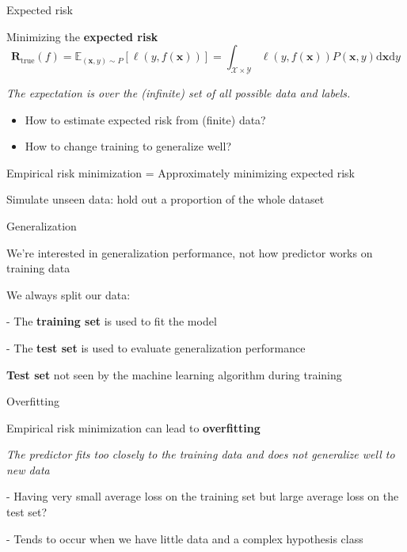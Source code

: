 \documentclass[12pt]{beamer}
\begin{document}
\begin{frame}{Expected risk}
	
Minimizing the \textbf{expected risk}
$$
\mathbf{R}_{\mathrm{true}} (f) = \mathbb{E}_{(\mathbf{x}, y) \sim P} \left[ \ell (y, f(\mathbf{x}))   \right] = 
\int_{\mathcal{X} \times \mathcal{Y}}  \ell (y, f(\mathbf{x})) P(\mathbf{x},y) \mathrm{ d}\mathbf{x} \mathrm{d}y
$$
	

\emph{The expectation is over the (infinite) set of all possible data and labels.}

\begin{itemize}
	\item How to estimate expected risk from (finite) data?
	\item How to change training to generalize well?
\end{itemize}

	



Empirical risk minimization = Approximately minimizing expected risk

Simulate unseen data: hold out a proportion of the whole dataset
	
\end{frame}





\begin{frame}{Generalization}

We're interested in generalization performance, not how predictor works on training data

We always split our data:
	
- The \textbf{training set} is used to fit the model

- The \textbf{test set} is used to evaluate generalization performance
	
\textbf{Test set} not seen by the machine learning algorithm during training
	

	
\end{frame}


\begin{frame}{Overfitting}

Empirical risk minimization can lead to \textbf{overfitting}

\emph{The predictor fits too closely to the training data and does not generalize well to new data}

- Having very small average loss on the training set but large average loss on
the test set?

- Tends to occur when we have little data and a complex hypothesis class
	

\end{frame}
\end{document}
